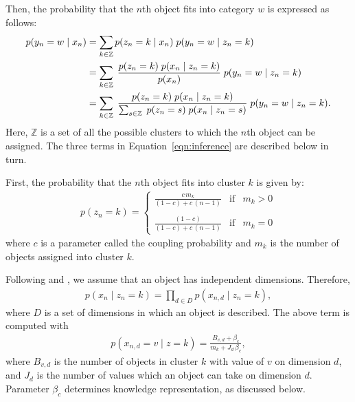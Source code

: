 \documentclass[doc]{apa6}
\begin{document}
Then, the probability that the $n$th object fits into category $w$ is expressed as follows:
\begin{align}
    p(y_{n} = w \; \vert \; x_{n})
    &= \sum_{k \in \mathbb{Z}} p(z_{n} = k \; \vert \; x_{n}) \; p(y_{n} = w \; \vert \; z_{n} = k) \notag\\
    &= \sum_{k \in \mathbb{Z}} \; \frac{p(z_{n} = k) \; p(x_{n} \;\vert\; z_{n} = k)}{p(x_{n})} \; p(y_{n} = w \; \vert \; z_{n} =
    k) \notag\\
    &= \sum_{k \in \mathbb{Z}} \; \frac{p(z_{n} = k) \; p(x_{n} \;\vert\; z_{n} = k)}{\sum_{s \in
    \mathbb{Z}} \; p(z_{n} = s) \; p(x_{n} \;\vert\; z_{n} = s)} \; p(y_{n} = w \; \vert \; z_{n} = k).
\label{eqn:inference}
\end{align}
Here, $\mathbb{Z}$ is a set of all the possible clusters to which the $n$th object can be assigned.
The three terms in Equation~\ref{eqn:inference} are described below in turn.

First, the probability that the $n$th object fits into cluster $k$ is given by:
\begin{align}
    p(z_{n} = k) = \left\{
        \begin{array}{rcl}
            \displaystyle \frac{c\,m_{k}}{(1 - c) + c\,(n - 1)} & \mbox{if} & m_{k} > 0\\
            \\
            \displaystyle \frac{(1 - c)}{(1 - c) + c\,(n - 1)} & \mbox{if} & m_{k} = 0
        \end{array}
    \right.
\label{eqn:prior}
\end{align}
where $c$ is a parameter called the coupling probability and $m_{k}$ is the number of objects
assigned into cluster $k$.

Following \textcite{Anderson1991a} and \textcite{Sanborn2010a}, we assume that an object has
independent dimensions. Therefore,
\begin{align}
    p(x_{n} \; \vert \; z_{n} = k) = \prod_{d \in D} p(x_{n,d} \; \vert \; z_{n} = k),
\label{eqn:feature1}
\end{align}
where $D$ is a set of dimensions in which an object is described.  The above term is computed with
\begin{align}
    p(x_{n,d} = v \; \vert \; z = k) = \frac{B_{v,d} + \beta_{c}}{m_{k} + J_{d} \, \beta_{c}},
\label{eqn:feature2}
\end{align}
where $B_{v,d}$ is the number of objects in cluster $k$ with value of $v$ on dimension $d$, and
$J_{d}$ is the number of values which an object can take on dimension $d$. Parameter $\beta_{c}$
determines knowledge representation, as discussed below.
\end{document}
